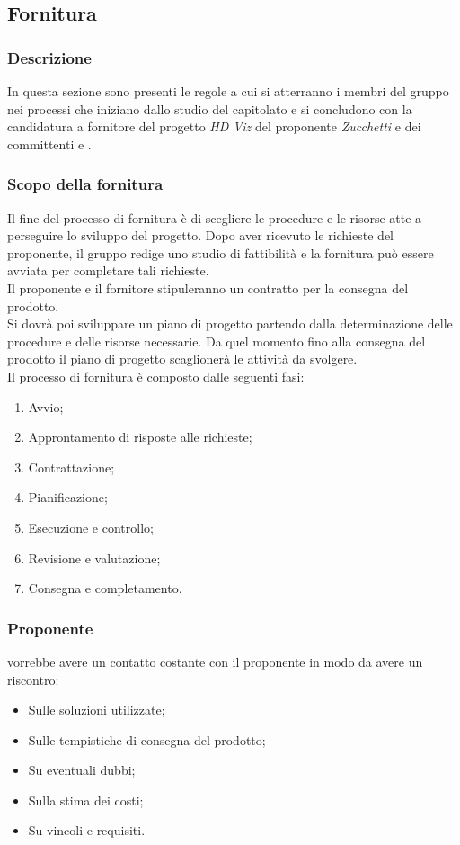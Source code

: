 \subsection{Fornitura}
\subsubsection{Descrizione}
In questa sezione sono presenti le regole a cui si atterranno i membri del gruppo \Gruppo{} nei processi che iniziano dallo studio del capitolato e si concludono con la candidatura a fornitore del progetto \textit{HD Viz} del proponente \textit{Zucchetti} e dei committenti \VT{} e \CR{}.  
\subsubsection{Scopo della fornitura}
Il fine del processo di fornitura è di scegliere le procedure e le risorse atte a perseguire lo sviluppo del progetto. Dopo aver ricevuto le richieste del proponente, il gruppo redige uno studio di fattibilità e la fornitura può essere avviata per completare tali richieste.\\
Il proponente e il fornitore stipuleranno un contratto per la consegna del prodotto.\\
Si dovrà poi sviluppare un piano di progetto partendo dalla determinazione delle procedure e delle risorse necessarie.
Da quel momento fino alla consegna del prodotto il piano di progetto scaglionerà le attività da svolgere. \\
 Il processo di fornitura è composto dalle seguenti fasi:
 \begin{enumerate}
 \item Avvio; 
\item Approntamento di risposte alle richieste;
\item Contrattazione;
\item Pianificazione;
\item Esecuzione e controllo;
\item Revisione e valutazione;
\item Consegna e completamento.
 \end{enumerate}
\subsubsection{Proponente}
\Gruppo{} vorrebbe avere un contatto costante con il proponente in modo da avere un riscontro:
\begin{itemize}
\item Sulle soluzioni utilizzate;
\item Sulle tempistiche di consegna del prodotto;
\item Su eventuali dubbi;
\item Sulla stima dei costi;
\item Su vincoli e requisiti.
\end{itemize}
